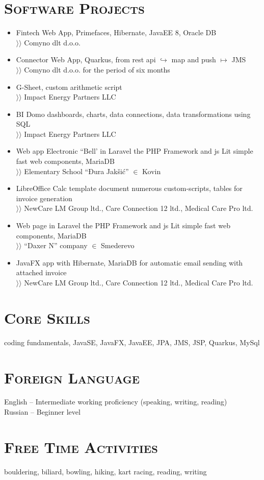 \documentclass{article}
\begin{document}
\section{\textsc{Software Projects}}

\begin{itemize}
\item  Fintech Web App, Primefaces, Hibernate, JavaEE 8, Oracle DB\\
$\rangle\!\rangle$ Comyno dlt d.o.o.
\item Connector Web App, Quarkus, from rest api $\hookrightarrow$ map and push $\mapsto$ JMS\\
$\rangle\!\rangle$ Comyno dlt d.o.o. for the period of six months
\item G-Sheet, custom arithmetic script\\
$\rangle\!\rangle$ Impact Energy Partners LLC
\item BI Domo dashboards, charts, data connections, data transformations using SQL\\
$\rangle\!\rangle$ Impact Energy Partners LLC
\item Web app Electronic ``Bell' in Laravel the PHP Framework and js Lit simple fast web components, MariaDB\\
$\rangle\!\rangle$ Elementary School ``Đura Jakšić'' $\in$ Kovin
\item LibreOffice Calc template document numerous custom-scripts, tables for invoice generation\\ 
$\rangle\!\rangle$ NewCare LM Group ltd., Care Connection 12 ltd., Medical Care Pro ltd.
\item Web page in Laravel the PHP Framework and js Lit simple fast web components, MariaDB\\
$\rangle\!\rangle$ ``Daxer N'' company $\in$ Smederevo
\item JavaFX app with Hibernate, MariaDB for automatic email sending with attached invoice\\
$\rangle\!\rangle$ NewCare LM Group ltd., Care Connection 12 ltd., Medical Care Pro ltd.
\end{itemize}

\section{\textsc{Core Skills}}

coding fundamentals, JavaSE, JavaFX, JavaEE, JPA, JMS, JSP,  Quarkus, MySql

\section{\textsc{Foreign Language}}

English  -- Intermediate working proficiency (speaking, writing, reading)\\
Russian -- Beginner level

\section{\textsc{Free Time Activities}}

bouldering, biliard, bowling, hiking, kart racing, reading, writing
\end{document}
